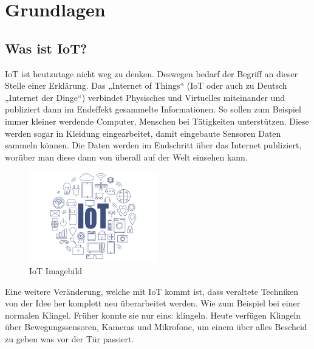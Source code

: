 

\chapter{Grundlagen}

    \section{Was ist IoT?}\label{ref:IoT}
        IoT ist heutzutage nicht weg zu denken. Deswegen bedarf der Begriff an dieser Stelle einer Erklärung. 
        Das „Internet of Things“ (IoT oder auch zu Deutsch „Internet der Dinge“) verbindet Physisches und Virtuelles miteinander und publiziert dann im Endeffekt gesammelte Informationen. So sollen zum Beispiel immer kleiner werdende Computer, Menschen bei Tätigkeiten unterstützen. Diese werden sogar in Kleidung eingearbeitet, damit eingebaute Sensoren Daten sammeln können. Die Daten werden im Endschritt über das Internet publiziert, worüber man diese dann von überall auf der Welt einsehen kann. 
        
        \begin{figure}[H]
            \centering
            \includegraphics[width=0.5\textwidth]{./media/images/IoT.jpg}
            \caption{IoT Imagebild \cite{bib:betanews}}
            \label{fig:IoT}
        \end{figure}
        
        Eine weitere Veränderung, welche mit IoT kommt ist, dass veraltete Techniken von der Idee her komplett neu überarbeitet werden. Wie zum Beispiel bei einer normalen Klingel. Früher konnte sie nur eins: klingeln. Heute verfügen Klingeln über Bewegungssensoren, Kameras und Mikrofone, um einem über alles Bescheid zu geben was vor der Tür passiert.  
        
